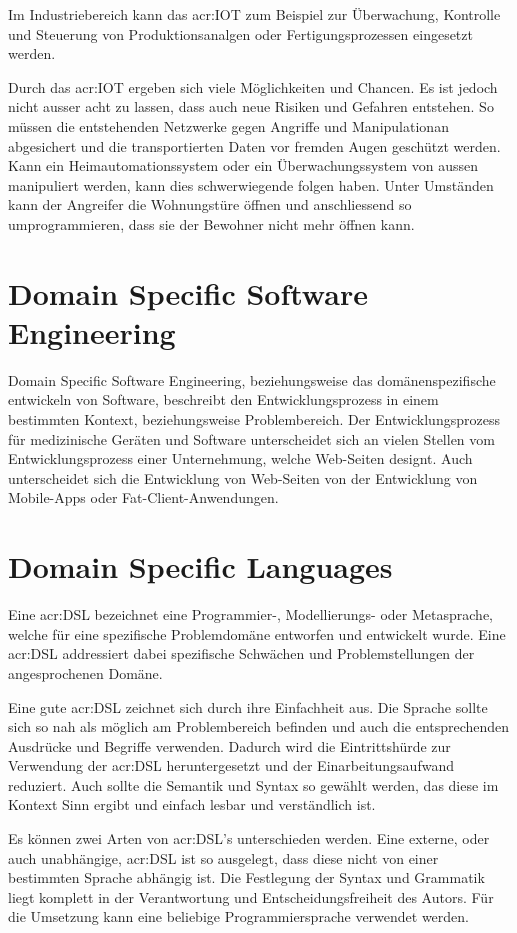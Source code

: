 Im Industriebereich kann das \gls{acr:IOT} zum Beispiel zur Überwachung, Kontrolle und Steuerung von Produktionsanalgen oder Fertigungsprozessen eingesetzt werden. 

Durch das \gls{acr:IOT} ergeben sich viele Möglichkeiten und Chancen. Es ist jedoch nicht ausser acht zu lassen, dass auch neue Risiken und Gefahren entstehen. So müssen die entstehenden Netzwerke gegen Angriffe und Manipulationan abgesichert und die transportierten Daten vor fremden Augen geschützt werden. Kann ein Heimautomationssystem oder ein Überwachungssystem von aussen manipuliert werden, kann dies schwerwiegende folgen haben. Unter Umständen kann der Angreifer die Wohnungstüre öffnen und anschliessend so umprogrammieren, dass sie der Bewohner nicht mehr öffnen kann.

\section{Domain Specific Software Engineering}
Domain Specific Software Engineering, beziehungsweise das domänenspezifische entwickeln von Software, beschreibt den Entwicklungsprozess in einem bestimmten Kontext, beziehungsweise Problembereich. Der Entwicklungsprozess für medizinische Geräten und Software unterscheidet sich an vielen Stellen vom Entwicklungsprozess einer Unternehmung, welche Web-Seiten designt. Auch unterscheidet sich die Entwicklung von Web-Seiten von der Entwicklung von Mobile-Apps oder Fat-Client-Anwendungen.

\section{Domain Specific Languages}
Eine \gls{acr:DSL} bezeichnet eine Programmier-, Modellierungs- oder Metasprache, welche für eine spezifische Problemdomäne entworfen und entwickelt wurde. Eine \gls{acr:DSL} addressiert dabei spezifische Schwächen und Problemstellungen der angesprochenen Domäne.

Eine gute \gls{acr:DSL} zeichnet sich durch ihre Einfachheit aus. Die Sprache sollte sich so nah als möglich am Problembereich befinden und auch die entsprechenden Ausdrücke und Begriffe verwenden. Dadurch wird die Eintrittshürde zur Verwendung der \gls{acr:DSL} heruntergesetzt und der Einarbeitungsaufwand reduziert. Auch sollte die Semantik und Syntax so gewählt werden, das diese im Kontext Sinn ergibt und einfach lesbar und verständlich ist.

Es können zwei Arten von \gls{acr:DSL}'s unterschieden werden. Eine externe, oder auch unabhängige, \gls{acr:DSL} ist so ausgelegt, dass diese nicht von einer bestimmten Sprache abhängig ist. Die Festlegung der Syntax und Grammatik liegt komplett in der Verantwortung und Entscheidungsfreiheit des Autors. Für die Umsetzung kann eine beliebige Programmiersprache verwendet werden.


